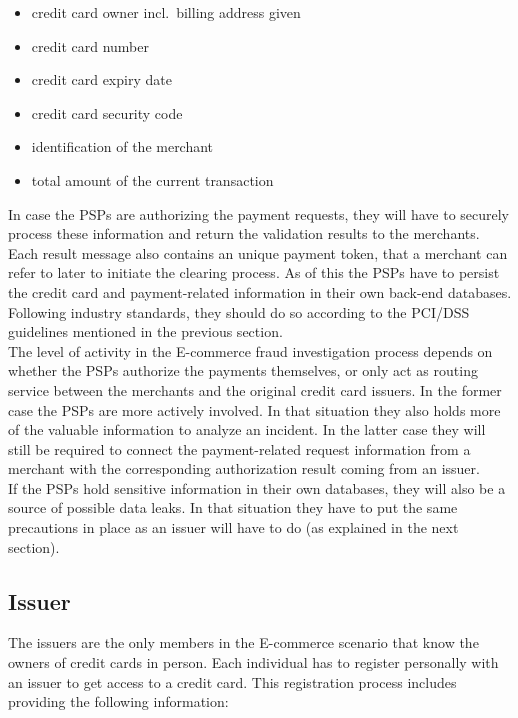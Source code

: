 \begin{itemize}
		\item credit card owner incl.\ billing address given
		\item credit card number
		\item credit card expiry date
		\item credit card security code
		\item identification of the merchant
		\item total amount of the current transaction
\end{itemize}

In case the \gls{PSP}s are authorizing the payment requests, they will have to securely process these information and return the validation results to the merchants. Each result message also contains an unique payment token, that a merchant can refer to later to initiate the clearing process. As of this the \gls{PSP}s have to persist the credit card and payment-related information in their own back-end databases. Following industry standards, they should do so according to the \gls{PCI/DSS} guidelines mentioned in the previous section. \\

The level of activity in the \gls{E-commerce} fraud investigation process depends on whether the \gls{PSP}s authorize the payments themselves, or only act as routing service between the merchants and the original credit card issuers. In the former case the \gls{PSP}s are more actively involved. In that situation they also holds more of the valuable information to analyze an incident. In the latter case they will still be required to connect the payment-related request information from a merchant with the corresponding authorization result coming from an issuer. \\

If the \gls{PSP}s hold sensitive information in their own databases, they will also be a source of possible data leaks. In that situation they have to put the same precautions in place as an issuer will have to do (as explained in the next section).


\subsection{Issuer}
\label{subsec:stakeholder_issuer}

The issuers are the only members in the \gls{E-commerce} scenario that know the owners of credit cards in person. Each individual has to register personally with an issuer to get access to a credit card. This registration process includes providing the following information: \@

